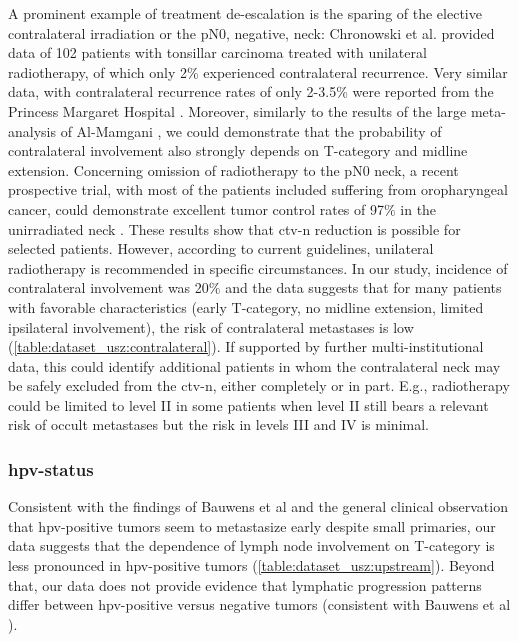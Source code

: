 \documentclass[\relativeRoot/main.tex]{subfiles}
\begin{document}
A prominent example of treatment de-escalation is the sparing of the elective contralateral irradiation or the pN0, negative, neck: Chronowski et al. \cite{chronowski_unilateral_2012} provided data of 102 patients with tonsillar carcinoma treated with unilateral radiotherapy, of which only 2\% experienced contralateral recurrence. Very similar data, with contralateral recurrence rates of only 2-3.5\% were reported from the Princess Margaret Hospital \cite{huang_re-evaluation_2017,osullivan_benefits_2001}. Moreover, similarly to the results of the large meta-analysis of Al-Mamgani \cite{al-mamgani_contralateral_2017}, we could demonstrate that the probability of contralateral involvement also strongly depends on T-category and midline extension. Concerning omission of radiotherapy to the pN0 neck, a recent prospective trial, with most of the patients included suffering from oropharyngeal cancer, could demonstrate excellent tumor control rates of 97\% in the unirradiated neck \cite{contreras_eliminating_2019}. These results show that \gls{ctv-n} reduction is possible for selected patients. However, according to current guidelines, unilateral radiotherapy is recommended in specific circumstances. In our study, incidence of contralateral involvement was 20\% and the data suggests that for many patients with favorable characteristics (early T-category, no midline extension, limited ipsilateral involvement), the risk of contralateral metastases is low (\cref{table:dataset_usz:contralateral}). If supported by further multi-institutional data, this could identify additional patients in whom the contralateral neck may be safely excluded from the \gls{ctv-n}, either completely or in part. E.g., radiotherapy could be limited to level II in some patients when level II still bears a relevant risk of occult metastases but the risk in levels III and IV is minimal.

\subsubsection*{\Gls{hpv}-status}

Consistent with the findings of Bauwens et al \cite{bauwens_prevalence_2021} and the general clinical observation that \gls{hpv}-positive tumors seem to metastasize early despite small primaries, our data suggests that the dependence of lymph node involvement on T-category is less pronounced in \gls{hpv}-positive tumors (\cref{table:dataset_usz:upstream}). Beyond that, our data does not provide evidence that lymphatic progression patterns differ between \gls{hpv}-positive versus negative tumors (consistent with Bauwens et al \cite{bauwens_prevalence_2021}).
\end{document}
